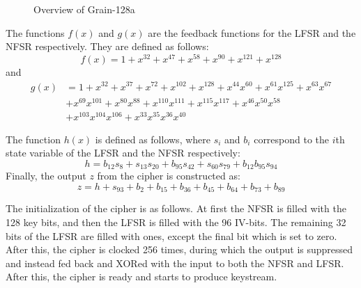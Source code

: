 {\begin{figure}
	\caption{Overview of Grain-128a}
	\label{fig:grain128a}
\end{figure}

The functions $f(x)$ and $g(x)$ are the feedback functions for the LFSR and the NFSR respectively. They are defined as follows:
\[
f(x) = 1 + x^{32} + x^{47} + x^{58} + x^{90} + x^{121} + x^{128}
\]
and
\begin{align*}
	g(x) &= 1 + x^{32} + x^{37} + x^{72} + x^{102} + x^{128} + x^{44}x^{60} + x^{61}x^{125} + x^{63}x^{67} \\
		 &+ x^{69}x^{101} + x^{80}x^{88} + x^{110}x^{111} + x^{115}x^{117} + x^{46}x^{50}x^{58} \\
		 &+ x^{103}x^{104}x^{106} + x^{33}x^{35}x^{36}x^{40}
\end{align*}

The function $h(x)$ is defined as follows, where $s_i$ and $b_i$ correspond to the $i$th state variable of the LFSR and the NFSR respectively: 
\[
h = b_{12}s_{8} + s_{13}s_{20} + b_{95}s_{42} + s_{60}s_{79} + b_{12}b_{95}s_{94}
\]
Finally, the output $z$ from the cipher is constructed as:
\[
z = h + s_{93} + b_{2} + b_{15} + b_{36} + b_{45} + b_{64} + b_{73} + b_{89}
\]

The initialization of the cipher is as follows. At first the NFSR is filled with the 128 key bits, and then the LFSR is filled with the 96 IV-bits. The remaining 32 bits of the LFSR are filled with ones, except the final bit which is set to zero. After this, the cipher is clocked 256 times, during which the output is suppressed and instead fed back and XORed with the input to both the NFSR and LFSR. After this, the cipher is ready and starts to produce keystream.

}
